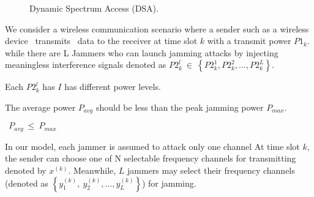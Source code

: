 \documentclass[letterpaper%
, twoside%
, 12pt%
,thesepararticles%
, english%
,creativecommons,hyperref, withAlgo2e%
]{thETS}
\begin{document}
\begin{figure}
{
}
\caption{Dynamic Spectrum Access (DSA).} \label{fig:DSA}
\end{figure}
 
 We consider a wireless communication scenario where a sender such as a wireless device \ transmits \ data to the receiver at time slot $\displaystyle k$ with a transmit power $\displaystyle P1_{k}$. while there are L Jammers who can launch jamming attacks by injecting meaningless interference signals denoted as $\displaystyle P2_{k}^{l} \ \in \ \left\{P2_{k}^{1} ,P2_{k}^{2} ,...,P2_{k}^{L}\right\} .$

Each $\displaystyle P2_{k}^{l}$ has $\displaystyle I$ has different power levels. 



 The average power $\displaystyle P_{avg}$ should be less than the peak jamming power $\displaystyle P_{max}$. 



$\displaystyle \ \ P_{avg} \ \leq \ P_{max}$ 



In our model, each jammer is assumed to attack only one channel At time slot $\displaystyle k,$the sender can choose one of N selectable frequency channels for transmitting denoted by $\displaystyle x^{( k)} .$ Meanwhile, $\displaystyle L$ jammers may select their frequency channels (denoted as $\displaystyle \left\{y_{1}^{( k)} ,\ y_{2}^{( k)} ,\dotsc ,y_{L}^{( k)}\right\}$) for jamming. 
  
\end{document}
